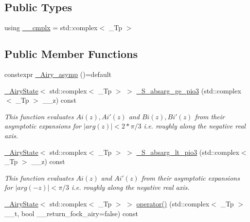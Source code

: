 \subsection*{Public Types}
\begin{DoxyCompactItemize}
\item 
using \hyperlink{classstd_1_1____detail_1_1__Airy__asymp_a5b480a849dafb98256e445a475813db1}{\+\_\+\+\_\+cmplx} = std\+::complex$<$ \+\_\+\+Tp $>$
\end{DoxyCompactItemize}
\subsection*{Public Member Functions}
\begin{DoxyCompactItemize}
\item 
constexpr \hyperlink{classstd_1_1____detail_1_1__Airy__asymp_a93f2010a2c48be2f38445420ba019a52}{\+\_\+\+Airy\+\_\+asymp} ()=default
\item 
\hyperlink{structstd_1_1____detail_1_1__AiryState}{\+\_\+\+Airy\+State}$<$ std\+::complex$<$ \+\_\+\+Tp $>$ $>$ \hyperlink{classstd_1_1____detail_1_1__Airy__asymp_a245564e7a1e3d653674c38629c4cb0e8}{\+\_\+\+S\+\_\+absarg\+\_\+ge\+\_\+pio3} (std\+::complex$<$ \+\_\+\+Tp $>$ \+\_\+\+\_\+z) const 
\begin{DoxyCompactList}\small\item\em This function evaluates $ Ai(z), Ai'(z) $ and $ Bi(z), Bi'(z) $ from their asymptotic expansions for $ |arg(z)| < 2*\pi/3 $ i.\+e. roughly along the negative real axis. \end{DoxyCompactList}\item 
\hyperlink{structstd_1_1____detail_1_1__AiryState}{\+\_\+\+Airy\+State}$<$ std\+::complex$<$ \+\_\+\+Tp $>$ $>$ \hyperlink{classstd_1_1____detail_1_1__Airy__asymp_a6ae932883f0b6cfe86c6e7beda807385}{\+\_\+\+S\+\_\+absarg\+\_\+lt\+\_\+pio3} (std\+::complex$<$ \+\_\+\+Tp $>$ \+\_\+\+\_\+z) const 
\begin{DoxyCompactList}\small\item\em This function evaluates $ Ai(z) $ and $ Ai'(z) $ from their asymptotic expansions for $ |arg(-z)| < \pi/3 $ i.\+e. roughly along the negative real axis. \end{DoxyCompactList}\item 
\hyperlink{structstd_1_1____detail_1_1__AiryState}{\+\_\+\+Airy\+State}$<$ std\+::complex$<$ \+\_\+\+Tp $>$ $>$ \hyperlink{classstd_1_1____detail_1_1__Airy__asymp_a02b787a1a0da15547e29a6c6fafad0e7}{operator()} (std\+::complex$<$ \+\_\+\+Tp $>$ \+\_\+\+\_\+t, bool \+\_\+\+\_\+return\+\_\+fock\+\_\+airy=false) const 
\end{DoxyCompactItemize}


